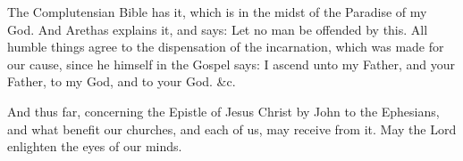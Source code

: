 The Complutensian Bible has it, which is in the midst of the Paradise of my God. And Arethas explains it, and says: Let no man be offended by this. All humble things agree to the dispensation of the incarnation, which was made for our cause, since he himself in the Gospel says: I ascend unto my Father, and your Father, to my God, and to your God. \&c.

And thus far, concerning the Epistle of Jesus Christ by John to the Ephesians, and what benefit our churches, and each of us, may receive from it. May the Lord enlighten the eyes of our minds.
